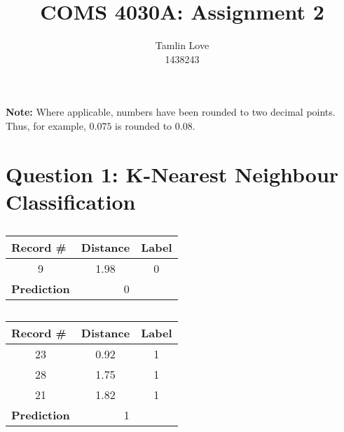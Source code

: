 \documentclass [11pt]{article}
\title{COMS 4030A: Assignment 2}
\author{Tamlin Love\\1438243}
\date{}
\begin{document}
\maketitle
\textbf{Note: }Where applicable, numbers have been rounded to two decimal points. Thus, for example, $0.075$ is rounded to $0.08$.
\section{Question 1: K-Nearest Neighbour Classification}
\subsection{}
\begin{table}[H]
\begin{tabular}{|l|c|l|}
\hline
\textbf{Record \#}      & \multicolumn{1}{l|}{\textbf{Distance}} & \textbf{Label}         \\ \hline
\multicolumn{1}{|c|}{9} & 1.98                                   & \multicolumn{1}{c|}{0} \\ \hline
\textbf{Prediction}     & \multicolumn{2}{c|}{0}                                          \\ \hline
\end{tabular}
\end{table}
\subsection{}
\begin{table}[H]
\begin{tabular}{|c|c|c|}
\hline
\multicolumn{1}{|l|}{\textbf{Record \#}}  & \multicolumn{1}{l|}{\textbf{Distance}} & \multicolumn{1}{l|}{\textbf{Label}} \\ \hline
23                                        & 0.92                                   & 1                                   \\ \hline
28                                        & 1.75                                   & 1                                   \\ \hline
21                                        & 1.82                                   & 1                                   \\ \hline
\multicolumn{1}{|l|}{\textbf{Prediction}} & \multicolumn{2}{c|}{1}                                                       \\ \hline
\end{tabular}
\end{table}
\end{document}
